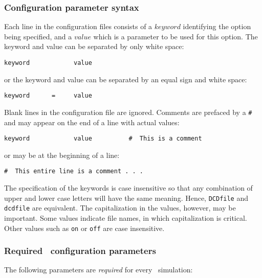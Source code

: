 \subsubsection{Configuration parameter syntax}
\label{section:configsyntax}
Each line
in the configuration files consists of a $keyword$ identifying the option
being specified, and a $value$ which is a parameter to be used for this
option.  The keyword and value can be separated by only white space:
\begin{verbatim}
keyword            value
\end{verbatim}
or the keyword and value can be separated by an equal sign and white space:
\begin{verbatim}
keyword      =     value
\end{verbatim}
Blank lines in the configuration file are ignored.  Comments are prefaced by
a \verb!#! and may appear on the end of a line with actual values:
\begin{verbatim}
keyword            value          #  This is a comment
\end{verbatim}
or may be at the beginning of a line:
\begin{verbatim}
#  This entire line is a comment . . . 
\end{verbatim}
The specification of the keywords is case insensitive 
so that any combination of 
upper and lower case letters will have the same meaning.  
Hence, \verb!DCDfile! and \verb!dcdfile! 
are equivalent.  The capitalization in the values, however, may be important.
Some values indicate file names, in which capitalization is critical.  
Other values such as \verb!on! or \verb!off! are case insensitive.

\subsubsection{Required \NAMD\ configuration parameters}
\label{section:configparams}

The following parameters are {\em required} for every
\NAMD\ simulation:

